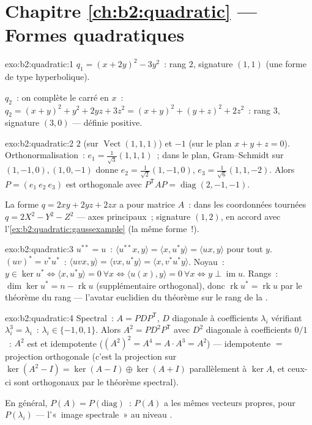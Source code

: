 \section*{Chapitre \ref{ch:b2:quadratic} --- Formes quadratiques}

\begin{solution}{exo:b2:quadratic:1}
$q_1 = (x + 2y)^2 - 3y^2$~: rang $2$, signature $(1, 1)$ (une
forme de type hyperbolique).

$q_2$~: on complète le carré en $x$~: $q_2 = (x + y)^2 + y^2 + 2yz +
3z^2 = (x+y)^2 + (y + z)^2 + 2z^2$~: rang $3$, signature $(3, 0)$
--- définie positive.
\end{solution}

\begin{solution}{exo:b2:quadratic:2}
 $2$ (sur $\operatorname{Vect}(1,1,1)$) et $-1$ (sur
le plan $x + y + z = 0$). Orthonormalisation~: $e_1 =
\frac{1}{\sqrt3}(1,1,1)$~; dans le plan, Gram--Schmidt sur $(1,-1,0),
(1,0,-1)$ donne $e_2 = \frac{1}{\sqrt2}(1,-1,0)$, $e_3 =
\frac{1}{\sqrt6}(1,1,-2)$. Alors $P = (e_1\ e_2\ e_3)$ est
orthogonale avec $P^{\mathsf T}AP = \operatorname{diag}(2,-1,-1)$.

La forme $q = 2xy + 2yz + 2zx$ a pour matrice $A$~: dans les
coordonnées tournées $q = 2X^2 - Y^2 - Z^2$ --- axes principaux~;
signature $(1,2)$, en accord avec l'\cref{ex:b2:quadratic:gaussexample}
(la même forme~!).
\end{solution}

\begin{solution}{exo:b2:quadratic:3}
$u^{**} = u$~: $\langle u^{**}x, y\rangle = \langle x, u^*y\rangle =
\langle ux, y\rangle$ pour tout $y$. $(uv)^* = v^*u^*$~: $\langle
uvx, y\rangle = \langle vx, u^*y\rangle = \langle x,
v^*u^*y\rangle$. Noyau~: $y \in \ker u^* \iff \langle x, u^*y
\rangle = 0\ \forall x \iff \langle u(x), y\rangle = 0\ \forall x
\iff y \perp \operatorname{im} u$. Rangs~: $\dim\ker u^* = n -
\operatorname{rk} u$ (supplémentaire orthogonal), donc
$\operatorname{rk} u^* = \operatorname{rk} u$ par le théorème du rang
--- l'avatar euclidien du théorème sur le rang de la .
\end{solution}

\begin{solution}{exo:b2:quadratic:4}
Spectral~: $A = PDP^{\mathsf T}$, $D$ diagonale à coefficients
$\lambda_i$ vérifiant $\lambda_i^3 = \lambda_i$~: $\lambda_i \in
\{-1, 0, 1\}$. Alors $A^2 = PD^2P^{\mathsf T}$ avec $D^2$ diagonale
à coefficients $0/1$~: $A^2$ est  et idempotente
($(A^2)^2 = A^4 = A\cdot A^3 = A^2$) ---  idempotente
$=$ projection orthogonale (c'est la projection sur
$\ker(A^2 - I) = \ker(A-I)\oplus\ker(A+I)$ parallèlement à $\ker A$,
et ceux-ci sont orthogonaux par le théorème spectral).

En général, $P(A) = P\!\left(\text{diag}\right)$~: $P(A)$ a les
mêmes vecteurs propres, pour  $P(\lambda_i)$ ---
l'«~image spectrale~» au niveau .
\end{solution}

